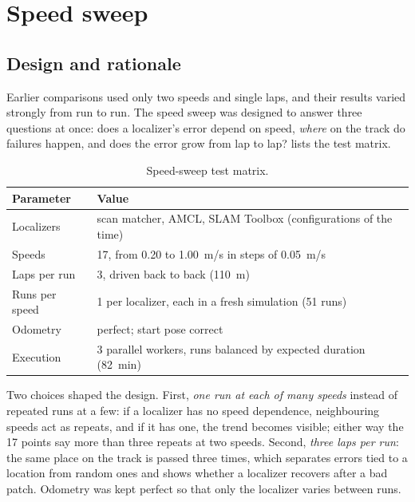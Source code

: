 \documentclass[11pt,letterpaper]{article}
\begin{document}
\section{Speed sweep}\label{sec:sweep}

\subsection{Design and rationale}

Earlier comparisons used only two speeds and single laps, and their results varied strongly from
run to run. The speed sweep was designed to answer three questions at once: does a localizer's
error depend on speed, \emph{where} on the track do failures happen, and does the error grow from
lap to lap?  lists the test matrix.

\begin{table}[htbp]
  \centering\small
  \caption{Speed-sweep test matrix.}
  \label{tab:sweep-design}
  \begin{tabular}{@{}ll@{}}
    \toprule
    Parameter & Value \\
    \midrule
    Localizers & scan matcher, AMCL, SLAM Toolbox (configurations of the time) \\
    Speeds & 17, from 0.20 to \SI{1.00}{m/s} in steps of \SI{0.05}{m/s} \\
    Laps per run & 3, driven back to back (\SI{110}{m}) \\
    Runs per speed & 1 per localizer, each in a fresh simulation (51 runs) \\
    Odometry & perfect; start pose correct \\
    Execution & 3 parallel workers, runs balanced by expected duration (\SI{82}{min}) \\
    \bottomrule
  \end{tabular}
\end{table}

Two choices shaped the design. First, \emph{one run at each of many speeds} instead of repeated runs
at a few: if a localizer has no speed dependence, neighbouring speeds act as repeats, and if it
has one, the trend becomes visible; either way the 17 points say more than three repeats at two
speeds. Second, \emph{three laps per run}: the same place on the track is passed three times, which
separates errors tied to a location from random ones and shows whether a localizer recovers after
a bad patch. Odometry was kept perfect so that only the localizer varies between runs.
\end{document}
